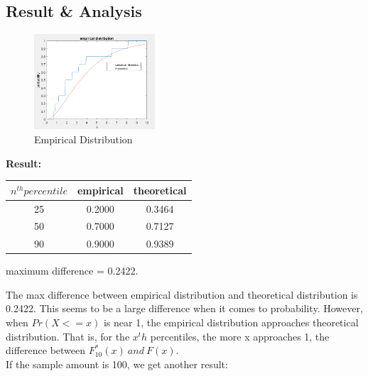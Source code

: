 \documentclass[twoside]{article}
\begin{document}
\subsection{\normalsize{Result \& Analysis}}
\newpage
\begin{multicols}{2}
\begin{figure}[H]
   \centering
   \includegraphics[width = 0.4\textwidth]{../data/solution2.png}  
   \caption{Empirical Distribution}
\end{figure}
\noindent \textbf {Result:\\[15pt]}
\begin{tabular}{|| c | c | c ||}
 \hline \hline
 $n^{th} percentile$ & empirical  & theoretical \\ \hline \hline
25 & 0.2000 & 0.3464 \\ \hline
50 & 0.7000 & 0.7127\\ \hline
90 & 0.9000 & 0.9389\\ \hline
\end{tabular}
maximum difference = 0.2422.
\end{multicols}
The max difference between empirical distribution and theoretical distribution is 0.2422. This seems to be a large difference when it comes to probability. However, when $Pr(X<=x)$ is near 1, the empirical distribution approaches theoretical distribution. That is, for the $x^th$ percentiles, the more x approaches 1, the difference between $F_{10}^*(x) \ and \ F(x)$. \\[15pt]
If the sample amount is 100, we get another result:\\
\end{document}

